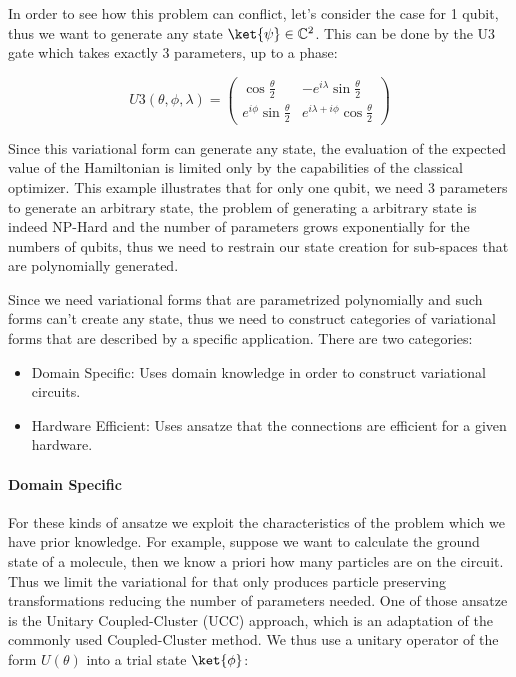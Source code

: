 In order to see how this problem can conflict, let's consider the case for 1 qubit, thus we want to generate any state $\ket{\psi} \in \mathbb{C}^2$. This can be done by the U3 gate which takes exactly 3 parameters, up to a phase:

\begin{equation*}
    U3 (\theta, \phi, \lambda) = \begin{pmatrix}
    \cos \frac{\theta}{2} & - e^{i\lambda} \sin \frac{\theta}{2} \\
    e^{i\phi} \sin \frac{\theta}{2} & e^{i\lambda + i\phi} \cos \frac{\theta}{2}
    \end{pmatrix}
\end{equation*}

Since this variational form can generate any state, the evaluation of the expected value of the Hamiltonian is limited only by the capabilities of the classical optimizer. This example illustrates that for only one qubit, we need 3 parameters to generate an arbitrary state, the problem of generating a arbitrary state is indeed NP-Hard and the number of parameters grows exponentially for the numbers of qubits, thus we need to restrain our state creation for sub-spaces that are polynomially generated. 

Since we need variational forms that are parametrized polynomially and such forms can't create any state, thus we need to construct categories of variational forms that are described by a specific application. There are two categories:

\begin{itemize}
    \item Domain Specific: Uses domain knowledge in order to construct variational circuits.
    \item Hardware Efficient: Uses ansatze that the connections are efficient for a given hardware.
\end{itemize}

\paragraph{Domain Specific}

For these kinds of ansatze we exploit the characteristics of the problem which we have prior knowledge. For example, suppose we want to calculate the ground state of a molecule, then we know a priori how many particles are on the circuit. Thus we limit the variational for that only produces particle preserving transformations reducing the number of parameters needed. One of those ansatze is the Unitary Coupled-Cluster (UCC) approach, which is an adaptation of the commonly used Coupled-Cluster method. We thus use a unitary operator of the form $U(\theta)$ into a trial state $\ket{\phi}$:

